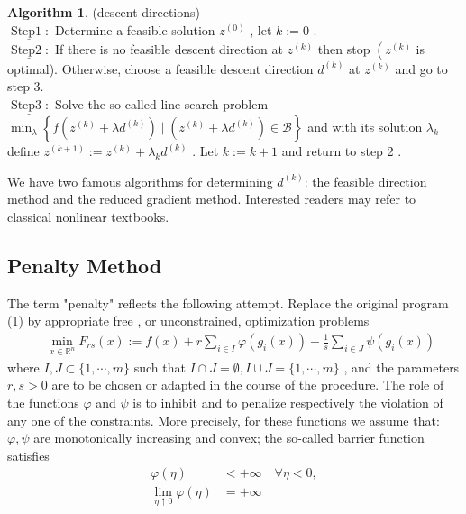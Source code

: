 \documentclass{article}
\theoremstyle{plain}
\theoremstyle{definition}
\newtheorem{algorithm}[theorem]{Algorithm}
\begin{document}
\begin{algorithm} (descent directions)\\
$\underline{\operatorname{Step 1}:}$ Determine a feasible solution $ z^{(0)}$ , let  $k:=0$ .\\
$\underline{\operatorname{Step 2}:}$ If there is no feasible descent direction at  $z^{(k)}$  then stop  $\left(z^{(k)}\right.$  is optimal). Otherwise, choose a feasible descent direction  $d^{(k)}$  at  $z^{(k)}$  and go to step 3.\\
$\underline{\operatorname{Step 3}:}$ Solve the so-called line search problem $\min _{\lambda}\left\{f\left(z^{(k)}+\lambda d^{(k)}\right) \mid\left(z^{(k)}+\lambda d^{(k)}\right) \in \mathcal{B}\right\}$ and with its solution  $\lambda_{k}$  define  $z^{(k+1)}:=z^{(k)}+\lambda_{k} d^{(k)}$ . Let  $k:=k+1$  and return to step 2 .
\end{algorithm}

We have two famous algorithms for determining $d^{(k)}$: the feasible direction method and the reduced gradient method. Interested readers may refer to classical nonlinear textbooks.

\subsection{Penalty Method}

The term "penalty" reflects the following attempt. Replace the original program (1) by appropriate free , or unconstrained,  optimization problems
\begin{equation}
\begin{array}{l}
\quad \min _{x \in \mathbb{R}^{n}} F_{r s}(x):= f(x)+r \sum_{i \in I} \varphi\left(g_{i}(x)\right)+\frac{1}{s} \sum_{i \in J} \psi\left(g_{i}(x)\right)
\end{array}
\end{equation}
where $ I, J \subset\{1, \cdots, m\}$  such that $ I \cap J=\emptyset, I \cup J=\{1, \cdots, m\}$ , and the parameters  $r, s>0$  are to be chosen or adapted in the course of the procedure. The role of the functions  $\varphi$  and  $\psi$  is to inhibit and to penalize respectively the violation of any one of the constraints. More precisely, for these functions we assume that:  $\varphi, \psi$  are monotonically increasing and convex; the so-called barrier function satisfies $$
\begin{aligned}
\varphi(\eta) &<+\infty \quad \forall \eta<0, \\
\lim _{\eta \uparrow 0} \varphi(\eta) &=+\infty
\end{aligned}
$$
\end{document}
